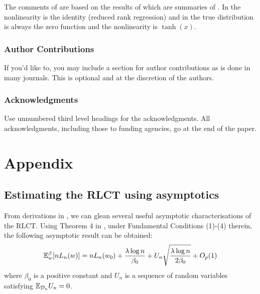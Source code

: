 \documentclass{article} %
\begin{document}
The comments of \citep[\S 7.6]{watanabe_algebraic_2009} are based on the results of \citep[\S 7.2]{watanabe_algebraic_2009} which are summaries of \cite{??,??}. In \cite{??} the nonlinearity is the identity (reduced rank regression) and in \cite{??} the true distribution is always the zero function and the nonlinearity is $\operatorname{tanh}(x)$.




\subsubsection*{Author Contributions}
If you'd like to, you may include  a section for author contributions as is done
in many journals. This is optional and at the discretion of the authors.

\subsubsection*{Acknowledgments}
Use unnumbered third level headings for the acknowledgments. All
acknowledgments, including those to funding agencies, go at the end of the paper.





\appendix
\section{Appendix}

\subsection{Estimating the RLCT using asymptotics}
\label{appendix:RLCT_estimation}

From derivations in \citep{watanabe_widely_2013}, we can glean several useful asymptotic characterisations of the RLCT. Using Theorem 4 in \cite{watanabe_widely_2013}, under Fundamental Conditions (1)-(4) therein, the following asymptotic result can be obtained: 
\begin{equation}
    {\mathbb{E}}_w^\beta [nL_n(w)] = nL_n(w_0) + \frac{\lambda \log n}{\beta_0} + U_n \sqrt{\frac{\lambda \log n}{2 \beta_0}} + O_p(1)
    \label{eq:Theorem4_WBIC}
\end{equation}
where $\beta_0$ is a positive constant and $U_n$ is a sequence of random variables satisfying $\mathbb{E}_{\mathcal D_n} U_n = 0$. %
\end{document}
